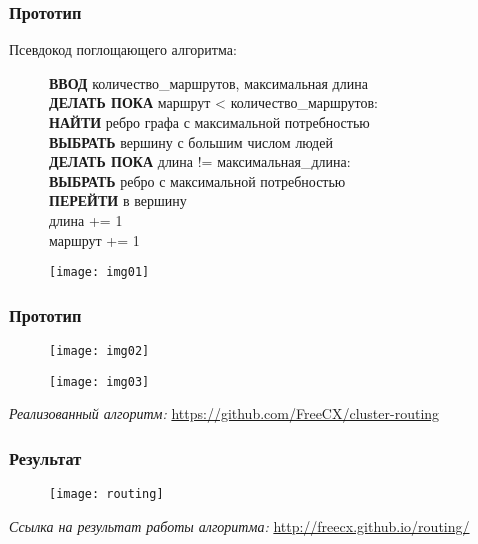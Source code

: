 \begin{frame} %
    \frametitle{Прототип}
    Псевдокод поглощающего алгоритма:\\
    \begin{figure}
        \begin{minipage}{0.6\textwidth}
            \tiny
            \textbf{ВВОД} количество\_маршрутов, максимальная длина\\
            \textbf{ДЕЛАТЬ ПОКА} маршрут < количество\_маршрутов:\\
                \hspace*{0.5cm}\textbf{НАЙТИ} ребро графа с максимальной потребностью\\
                \hspace*{0.5cm}\textbf{ВЫБРАТЬ} вершину с большим числом людей\\
                \hspace*{0.5cm}\textbf{ДЕЛАТЬ ПОКА} длина != максимальная\_длина:\\
                    \hspace*{1.0cm}\textbf{ВЫБРАТЬ} ребро с максимальной потребностью\\
                    \hspace*{1.0cm}\textbf{ПЕРЕЙТИ} в вершину\\
                    \hspace*{1.0cm}длина += 1\\
                \hspace*{0.5cm}маршрут += 1\\
        \end{minipage}
        \begin{minipage}{0.37\textwidth}
            \texttt{[image: img01]}
        \end{minipage}
    \end{figure}
\end{frame}

\begin{frame} %
    \frametitle{Прототип}
    \begin{figure}
        \begin{minipage}{0.47\textwidth}
            \texttt{[image: img02]}
        \end{minipage}
        \begin{minipage}{0.47\textwidth}
            \texttt{[image: img03]}
        \end{minipage}
    \end{figure}
    \small\emph{Реализованный алгоритм:} \url{https://github.com/FreeCX/cluster-routing}\\
\end{frame}

\begin{frame} %
    \frametitle{Результат}
    \begin{figure}
        \center
        \texttt{[image: routing]}
    \end{figure}
    \small\emph{Ссылка на результат работы алгоритма:} \url{http://freecx.github.io/routing/}
\end{frame}
